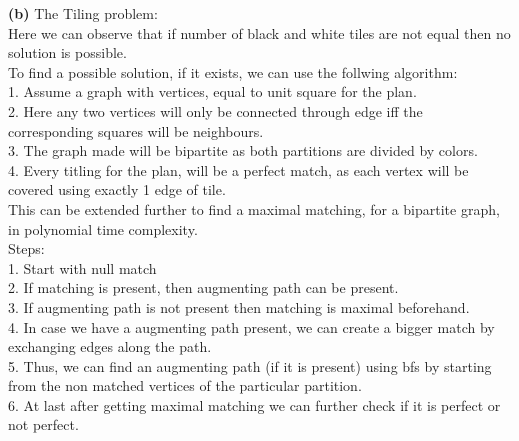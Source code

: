 \documentclass[11pt]{article}
\renewcommand\part[1]{\vspace{.10in}\textbf{(#1)}}
\begin{document}
\part{b}
The Tiling problem:\\
Here we can observe that if number of black and white tiles are not equal then no solution is possible.\\
To find a possible solution, if it exists, we can use the follwing algorithm:\\
1. Assume a graph with vertices, equal to unit square for the plan.\\
2. Here any two vertices will only be connected through edge iff the corresponding squares will be neighbours.\\
3. The graph made will be bipartite as both partitions are divided by colors.\\
4. Every titling for the plan, will be a perfect match, as each vertex will be covered using exactly 1 edge of tile.\\[15pt]
This can be extended further to find a maximal matching, for a bipartite graph, in polynomial time complexity.\\
Steps:\\
1. Start with null match\\
2. If matching is present, then augmenting path can be present.\\
3. If augmenting path is not present then matching is maximal beforehand.\\
4. In case we have a augmenting path present, we can create a bigger match by exchanging edges along the path.\\
5. Thus, we can find an augmenting path (if it is present) using bfs by starting from the non matched vertices of the particular partition.\\
6. At last after getting maximal matching we can further check if it is perfect or not perfect.\\
\end{document}
